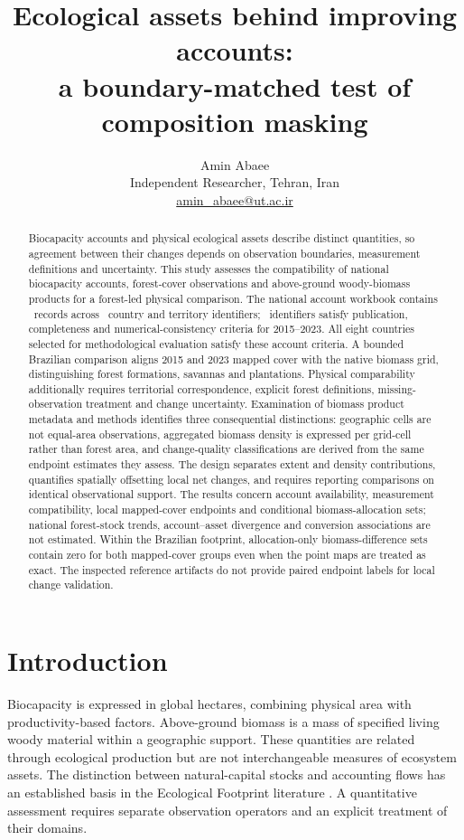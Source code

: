 \documentclass[11pt,a4paper]{article}
\title{Ecological assets behind improving accounts:\\a boundary-matched test of composition masking}
\author{Amin Abaee\\\small Independent Researcher, Tehran, Iran\\\small\href{mailto:amin_abaee@ut.ac.ir}{amin\_abaee@ut.ac.ir}}
\date{}
\begin{document}
\maketitle
\begin{abstract}
Biocapacity accounts and physical ecological assets describe distinct quantities, so agreement between their changes depends on observation boundaries, measurement definitions and uncertainty. This study assesses the compatibility of national biocapacity accounts, forest-cover observations and above-ground woody-biomass products for a forest-led physical comparison. The national account workbook contains \NationalRows\ records across \CountryIDs\ country and territory identifiers; \AccountPass\ identifiers satisfy publication, completeness and numerical-consistency criteria for 2015--2023. All eight countries selected for methodological evaluation satisfy these account criteria. A bounded Brazilian comparison aligns 2015 and 2023 mapped cover with the native biomass grid, distinguishing forest formations, savannas and plantations. Physical comparability additionally requires territorial correspondence, explicit forest definitions, missing-observation treatment and change uncertainty. Examination of biomass product metadata and methods identifies three consequential distinctions: geographic cells are not equal-area observations, aggregated biomass density is expressed per grid-cell rather than forest area, and change-quality classifications are derived from the same endpoint estimates they assess. The design separates extent and density contributions, quantifies spatially offsetting local net changes, and requires reporting comparisons on identical observational support. The results concern account availability, measurement compatibility, local mapped-cover endpoints and conditional biomass-allocation sets; national forest-stock trends, account--asset divergence and conversion associations are not estimated. Within the Brazilian footprint, allocation-only biomass-difference sets contain zero for both mapped-cover groups even when the point maps are treated as exact. The inspected reference artifacts do not provide paired endpoint labels for local change validation.
\end{abstract}

\section{Introduction}
Biocapacity is expressed in global hectares, combining physical area with productivity-based factors. Above-ground biomass is a mass of specified living woody material within a geographic support. These quantities are related through ecological production but are not interchangeable measures of ecosystem assets. The distinction between natural-capital stocks and accounting flows has an established basis in the Ecological Footprint literature \citep{Mancini2017}. A quantitative assessment requires separate observation operators and an explicit treatment of their domains.
\end{document}
